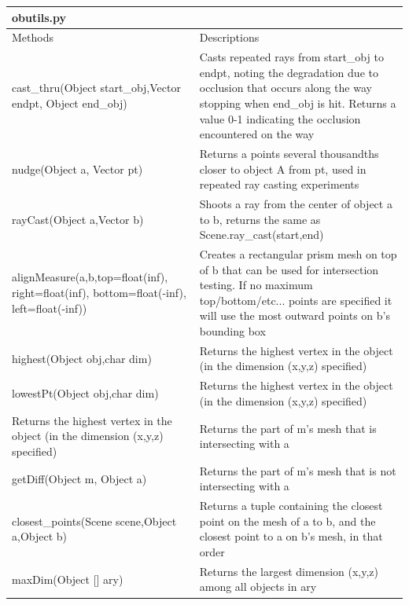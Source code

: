 \begin{longtabu}{| p{5cm} | p{10cm} |}
	obutils.py  \\\hline
	Methods & Descriptions \\\hline
	
	cast\_thru(Object start\_obj,Vector endpt, Object end\_obj) & Casts repeated rays from start\_obj to endpt, noting the degradation due to occlusion that occurs along the way stopping when end\_obj is hit. Returns a value 0-1 indicating the occlusion encountered on the way \\\hline
	
	nudge(Object a, Vector pt) & Returns a points several thousandths closer to object A from pt, used in repeated ray casting experiments \\\hline
	
	rayCast(Object a,Vector b) & Shoots a ray from the center of object a to b, returns the same as Scene.ray\_cast(start,end) \\\hline
	
	alignMeasure(a,b,top=float(inf), right=float(inf),
	bottom=float(-inf), left=float(-inf)) & Creates a rectangular prism mesh on top of b that can be used for intersection testing. If no maximum top/bottom/etc... points are specified it will use the most outward points on b's bounding box \\\hline	
	
	highest(Object obj,char dim) & Returns the highest vertex in the object (in the dimension (x,y,z) specified) \\\hline
	
	lowestPt(Object obj,char dim) & Returns the highest vertex in the object (in the dimension (x,y,z) specified) \\\hline
	
	Returns the highest vertex in the object (in the dimension (x,y,z) specified) & Returns the part of m's mesh that is intersecting with a \\\hline
	
	getDiff(Object m, Object a) & Returns the part of m's mesh that is not intersecting with a \\\hline
	
	closest\_points(Scene scene,Object a,Object b) & Returns a tuple containing the closest point on the mesh of a to b, and the closest point to a on b's mesh, in that order \\\hline
	
	maxDim(Object [] ary) & Returns the largest dimension (x,y,z) among all objects in ary \\\hline
	

\end{longtabu}

